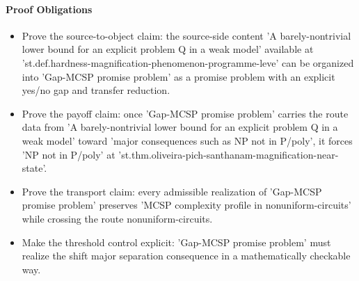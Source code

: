 \documentclass[11pt]{article}
\begin{document}
\paragraph{Proof Obligations}
\begin{itemize}[leftmargin=*,itemsep=0.2em]
\item Prove the source-to-object claim: the source-side content 'A barely-nontrivial lower bound for an explicit problem Q in a weak model' available at 'st.def.hardness-magnification-phenomenon-programme-leve' can be organized into 'Gap-MCSP promise problem' as a promise problem with an explicit yes/no gap and transfer reduction.
\item Prove the payoff claim: once 'Gap-MCSP promise problem' carries the route data from 'A barely-nontrivial lower bound for an explicit problem Q in a weak model' toward 'major consequences such as NP not in P/poly', it forces 'NP not in P/poly' at 'st.thm.oliveira-pich-santhanam-magnification-near-state'.
\item Prove the transport claim: every admissible realization of 'Gap-MCSP promise problem' preserves 'MCSP complexity profile in nonuniform-circuits' while crossing the route nonuniform-circuits.
\item Make the threshold control explicit: 'Gap-MCSP promise problem' must realize the shift major separation consequence in a mathematically checkable way.
\end{itemize}
\end{document}
